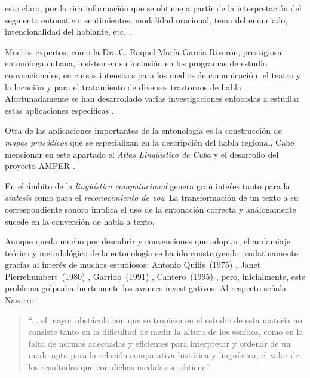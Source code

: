 esto claro, por la rica informaci\'on que se obtiene a partir de la interpretaci\'on del segmento entonativo:
sentimientos, modalidad oracional, tema del enunciado, intencionalidad del hablante, etc. \cite{vidal2014entonacion}. 



Muchos expertos, como la Dra.C. Raquel Mar\'ia Garc\'ia River\'on, prestigiosa enton\'ologa cubana, insisten en su inclusi\'on en los programas de estudio convencionales, en cursos intensivos para los medios de comunicaci\'on, el teatro y la locuci\'on y para el tratamiento de diversos trastornos de habla \cite{pedrosa2009entonacion}. Afortunadamente se han desarrollado varias investigaciones enfocadas a estudiar estas aplicaciones espec\'ificas \cite{riveronlocutores, marrero2007estudio}.


Otra de las aplicaciones importantes de la entonolog\'ia es la construcci\'on de \emph{mapas pros\'odicos}
que se especializan en la descripci\'on del habla regional. Cabe mencionar en este apartado el \emph{Atlas Ling\"uistico de Cuba} \cite{riveron1991atlas} y el desarrollo del proyecto AMPER \cite{roseanoetiquetaje, ruiz2014entonacion}.


En el \'ambito de la \emph{ling\"u\'istica computacional} genera gran inte\'res tanto para la \emph{síntesis} como para el \emph{reconocimiento de voz}. La transformación de un texto a su correspondiente sonoro implica el uso de la entonación correcta y análogamente sucede en la conversión de habla a texto.


Aunque queda mucho por descubrir y convenciones que adoptar, el andamiaje teórico y metodológico de la entonolog\'ia se ha ido construyendo paulatinamente gracias al inter\'es de muchos estudiosos: Antonio Quilis~(1975) \cite{quilis1975unidades}, Janet Pierrehumbert~(1980) \cite{pierrehumbert1980phonology}, Garrido~(1991) \cite{garrido1991modelizacion}, Cantero~(1995) \cite{cantero1995estructura}, pero, inicialmente, este problema golpeaba fuertemente los avances investigativos. Al respecto se\~nala Navarro:

\begin{quote}
``... el mayor obstáculo con que se tropieza en el estudio de esta materia no consiste tanto en la dificultad de medir la altura de los sonidos, como en la falta de normas adecuadas y eficientes para interpretar y ordenar de un modo apto para la relación comparativa histórica y lingüística, el valor de los resultados que con dichas medidas se obtiene.''
\end{quote}


